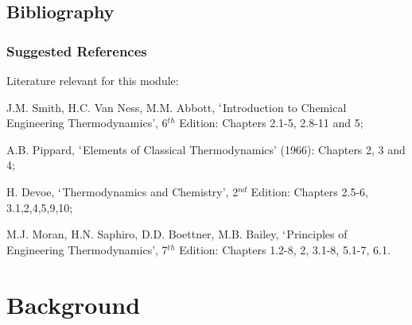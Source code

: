 \documentclass[10pt,compress]{beamer}
\begin{document}
\subsection{Bibliography} 

\begin{frame}
 \frametitle{Suggested References}
  Literature relevant for this module:
  \begin{enumerate}[{[}1{]}]
   \item J.M. Smith, H.C. Van Ness, M.M. Abbott, $\lq$Introduction to Chemical Engineering Thermodynamics', 6$^{th}$ Edition: Chapters 2.1-5, 2.8-11 and 5;
   \item A.B. Pippard, $\lq$Elements of Classical Thermodynamics' (1966): Chapters 2, 3 and 4;
   \item H. Devoe, $\lq$Thermodynamics and Chemistry', 2$^{nd}$ Edition: Chapters 2.5-6, 3.1,2,4,5,9,10;
   \item M.J. Moran, H.N. Saphiro, D.D. Boettner, M.B. Bailey, $\lq$Principles of Engineering Thermodynamics', 7$^{th}$ Edition: Chapters 1.2-8, 2, 3.1-8, 5.1-7, 6.1.
  \end{enumerate}
\end{frame}
 
\section{Background} 
\end{document}
